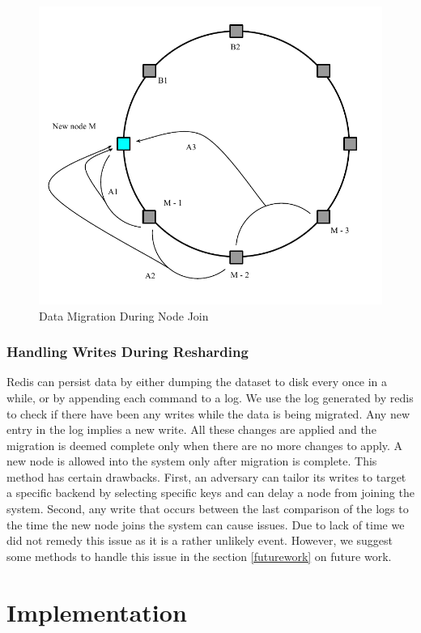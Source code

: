 \documentclass[10pt,twocolumn,letterpaper]{article}
\begin{document}
\begin{figure}[hbt]
  \centering
  \includegraphics[scale=0.6]{handle_join.pdf}
  \caption{Data Migration During Node Join}
  \label{handlejoin}
\end{figure}


\subsubsection{Handling Writes During Resharding} Redis can persist data by either dumping the dataset to disk every once in a while, or by appending each command to a log. We use the log generated by redis to check if there have been any writes while the data is being migrated. Any new entry in the log implies a new write. All these changes are applied and the migration is deemed complete only when there are no more changes to apply. A new node is allowed into the system only after migration is complete. This method has certain drawbacks. First, an adversary can tailor its writes to target a specific backend by selecting specific keys and can delay a node from joining the system. Second, any write that occurs between the last comparison of the logs to the time the new node joins the system can cause issues. Due to lack of time we did not remedy this issue as it is a rather unlikely event. However, we suggest some methods to handle this issue in the section \ref{futurework} on future work.



\section{Implementation} \label{implementation}
\end{document}
